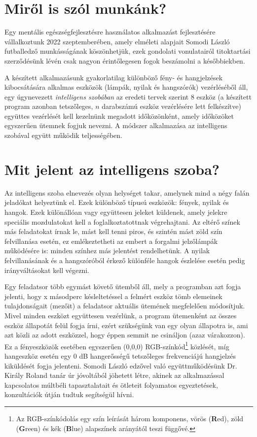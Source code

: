 \documentclass[tocnopagenum]{thesis-ekf}
\theoremstyle{definition}
\theoremstyle{remark}
\begin{document}
	\section{Miről is szól munkánk?}
	Egy mentális egészségfejlesztésre használatos alkalmazást fejlesztésére vállalkoztunk 2022 szeptemberében, amely elméleti alapjait Somodi László futballedző munkásságának köszönhetjük, ezek gondolati vonulatairól titoktartási szerződésünk lévén csak nagyon érintőlegesen fogok beszámolni a későbbiekben. 
	
	A készített alkalmazásunk gyakorlatilag különböző fény- és hangjelzések kibocsátására alkalmas eszközök (lámpák, nyilak és hangszórók) vezérléséből áll, egy úgynevezett \emph{intelligens szobában} az eredeti tervek szerint 8 eszköz (a készített program azonban tetszőleges, $n$ darabszámú eszköz vezérlésére lett felkészítve) együttes vezérlését kell kezelnünk megadott időközönként, amely időközöket egyszerűen ütemnek fogjuk nevezni.
	A módszer alkalmazása az intelligens szobával együtt működik teljességében.
	
	\section{Mit jelent az intelligens szoba?}
	Az intelligens szoba elnevezés olyan helységet takar, amelynek mind a négy falán jeladókat helyeztünk el.
	Ezek különböző típusú eszközök: fények, nyilak és hangok. 
	Ezek különállóan vagy együttesen jeleket küldenek, amely jelekre speciális mozdulatokat kell a foglalkoztatottnak végrehajtani.
	Az eltérő színek más feladatokat írnak le, mást kell tenni piros, és szintén mást zöld szín felvillanása esetén, ez emlékeztetheti az embert a forgalmi jelzőlámpák működésére is: minden színhez más jelentést rendelhetünk. A nyilak felvillanásának és a hangszóróból érkező különféle hangok észlelése esetén pedig irányváltásokat kell végezni.
	
	Egy feladatsor több egymást követő ütemből áll, mely a programban azt fogja jelenti, hogy x másodperc késleltetéssel a felmért eszköz tömb elemeinek tulajdonságait (mezőit) a feladatsor aktuális ütemének megfelelően módosítjuk. Mivel minden eszközt együttesen vezérlünk, a program ütemenként az összes eszköz állapotát felül fogja írni, ezért szükségünk van egy olyan állapotra is, ami azt közli az adott eszközzel, hogy éppen semmit ne csináljon (azaz várakozzon). Ez a fényeszközök esetében egyszerűen (0,0,0) RGB-színkód\footnote{Az RGB-színkódolás egy szín leírását három komponens, vörös (\textbf{R}ed), zöld (\textbf{G}reen) és kék (\textbf{B}lue) alapszínek arányától teszi függővé.} közlését, míg hangeszköz esetén egy 0 dB hangerősségű tetszőleges frekvenciájú hangjelzés kiküldését fogja jelenteni.
	Somodi László edzővel való együttműködésünk Dr. Király Roland tanár úr jóvoltából jöhetett létre, akinek az alkalmazással kapcsolatos múltbéli tapasztalatait és  ötleteit folyamatos egyeztetések, konzultációk útján tudtuk segítségül hívni.
\end{document}
